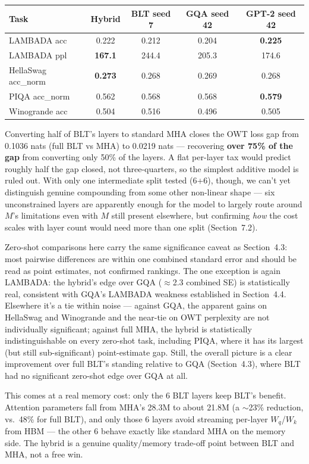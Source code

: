 \documentclass[11pt]{article}
\begin{document}
\begin{center}
\begin{tabular}{lcccc}
\toprule
Task & Hybrid & BLT seed 7 & GQA seed 42 & GPT-2 seed 42 \\
\midrule
LAMBADA acc & 0.222 & 0.212 & 0.204 & \textbf{0.225} \\
LAMBADA ppl & \textbf{167.1} & 244.4 & 205.3 & 174.6 \\
HellaSwag acc\_norm & \textbf{0.273} & 0.268 & 0.269 & 0.268 \\
PIQA acc\_norm & 0.562 & 0.568 & 0.568 & \textbf{0.579} \\
Winogrande acc & 0.504 & 0.516 & 0.496 & 0.505 \\
\bottomrule
\end{tabular}
\end{center}

Converting half of BLT's layers to standard MHA closes the OWT loss gap from 0.1036 nats (full BLT vs MHA) to 0.0219 nats --- recovering \textbf{over 75\% of the gap} from converting only 50\% of the layers. A flat per-layer tax would predict roughly half the gap closed, not three-quarters, so the simplest additive model is ruled out. With only one intermediate split tested (6+6), though, we can't yet distinguish genuine compounding from some other non-linear shape --- six unconstrained layers are apparently enough for the model to largely route around $M$'s limitations even with $M$ still present elsewhere, but confirming \emph{how} the cost scales with layer count would need more than one split (Section~7.2).

Zero-shot comparisons here carry the same significance caveat as Section~4.3: most pairwise differences are within one combined standard error and should be read as point estimates, not confirmed rankings. The one exception is again LAMBADA: the hybrid's edge over GQA ($\approx$2.3 combined SE) is statistically real, consistent with GQA's LAMBADA weakness established in Section~4.4. Elsewhere it's a tie within noise --- against GQA, the apparent gains on HellaSwag and Winogrande and the near-tie on OWT perplexity are not individually significant; against full MHA, the hybrid is statistically indistinguishable on every zero-shot task, including PIQA, where it has its largest (but still sub-significant) point-estimate gap. Still, the overall picture is a clear improvement over full BLT's standing relative to GQA (Section~4.3), where BLT had no significant zero-shot edge over GQA at all.

This comes at a real memory cost: only the 6 BLT layers keep BLT's benefit. Attention parameters fall from MHA's 28.3M to about 21.8M (a $\sim$23\% reduction, vs.\ 48\% for full BLT), and only those 6 layers avoid streaming per-layer $W_q$/$W_k$ from HBM --- the other 6 behave exactly like standard MHA on the memory side. The hybrid is a genuine quality/memory trade-off point between BLT and MHA, not a free win.
\end{document}

